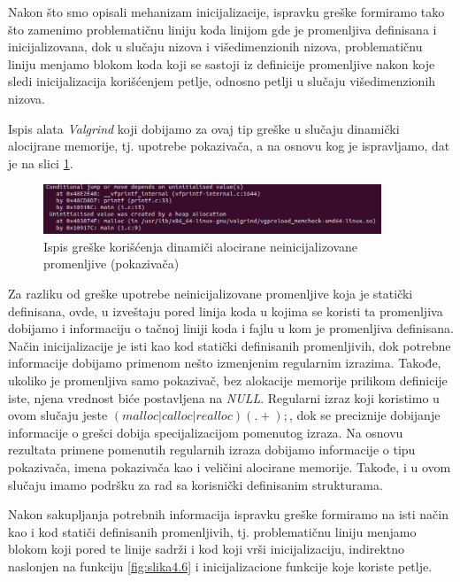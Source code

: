 \documentclass[12pt,oneside]{memoir}
\theoremstyle{plain}
\theoremstyle{definition}
\begin{document}
Nakon što smo opisali mehanizam inicijalizacije, ispravku greške formiramo tako što zamenimo problematičnu liniju koda linijom gde je promenljiva definisana i inicijalizovana, dok u slučaju nizova i višedimenzionih nizova, problematičnu liniju menjamo blokom koda koji se sastoji iz definicije promenljive nakon koje sledi inicijalizacija korišćenjem petlje, odnosno petlji u slučaju višedimenzionih nizova. 

Ispis alata \textit{Valgrind} koji dobijamo za ovaj tip greške u slučaju dinamički alocijrane memorije, tj. upotrebe pokazivača, a na osnovu kog je ispravljamo, dat je na slici \ref{fig:slika4.7}.

\begin{figure}[!ht]
  \centering
  \includegraphics[width=0.9\textwidth]{UninitialisedDinamic.png}
  \caption{Ispis greške korišćenja dinamiči alocirane neinicijalizovane promenljive (pokazivača)}
  \label{fig:slika4.7}
\end{figure} 

Za razliku od greške upotrebe neinicijalizovane promenljive koja je statički definisana, ovde, u izveštaju pored linija koda u kojima se koristi ta promenljiva dobijamo i informaciju o tačnoj liniji koda i fajlu u kom je promenljiva definisana. Način inicijalizacije je isti kao kod statički definisanih promenljivih, dok potrebne informacije dobijamo primenom nešto izmenjenim regularnim izrazima. Takođe, ukoliko je promenljiva samo pokazivač, bez alokacije memorije prilikom definicije iste, njena vrednost biće postavljena na \textit{NULL}. Regularni izraz koji koristimo u ovom slučaju jeste $ (malloc|calloc|realloc)(.+); $, dok se preciznije dobijanje informacije o grešci dobija specijalizacijom pomenutog izraza. Na osnovu rezultata primene pomenutih regularnih izraza dobijamo informacije o tipu pokazivača, imena pokazivača kao i veličini alocirane memorije. Takođe, i u ovom slučaju imamo podršku za rad sa korisnički definisanim strukturama. 

Nakon sakupljanja potrebnih informacija ispravku greške formiramo na isti način kao i kod statiči definisanih promenljivih, tj. problematičnu liniju menjamo blokom koji pored te linije sadrži i kod koji vrši inicijalizaciju, indirektno naslonjen na funkciju \ref{fig:slika4.6} i inicijalizacione funkcije koje koriste petlje.
\end{document}
